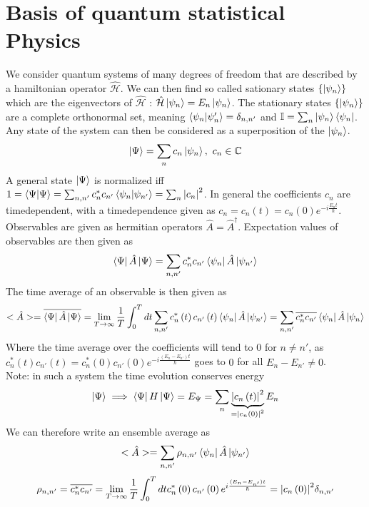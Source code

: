 \documentclass{report}
\begin{document}
\section{Basis of quantum statistical Physics}
We consider quantum systems of many degrees of freedom that are described by a hamiltonian operator $\hat{\mathcal{H}}$. We can then find so called sationary states $\{\ket{\psi_n}\} $ which are the eigenvectors of $\hat{\mathcal{H}}$ : $\hat{\mathcal{H}}\ket{\psi_n} = E_n\ket{\psi_n}$. The stationary states $\{\ket{\psi_n}\} $ are a complete orthonormal set, meaning $\bra{\psi_n}\ket{\psi_n'} = \delta_{n,n'}$ and $\mathbb{I} = \sum_{n} \ket{\psi_n}\bra{\psi_n} $.\\
Any state of the system can then be considered as a superposition of the $\ket{\psi_n}$.\[
  \ket{\Psi} = \sum_{n} c_n \ket{\psi_n} ,  \text{  } c_n \in \mathbb{C} 
\] 
A general state $\ket{\Psi}$ is normalized iff $1 = \bra{\Psi}\ket{\Psi} = \sum_{n,n'} c_n^* c_{n'} \bra{\psi_n}\ket{\psi_{n'}} = \sum_{n} \abs{c_n}^2  $. In general the coefficients $c_n$ are timedependent, with a timedependence given as $c_n = c_n\left( t \right) = c_n\left( 0 \right) e^{-i \frac{E_n t}{\hbar}}$.\\
Observables are given as hermitian operators $\hat{A} = \hat{A}^{\dagger}$. Expectation values of observables are then given as \[
\bra{\Psi} \hat{A} \ket{\Psi} = \sum_{n,n'} c_n^* c_{n'} \bra{\psi_n} \hat{A} \ket{\psi_{n'}} 
\] 
The time average of an observable is then given as \[
  <\hat{A}> = \overline{\bra{\Psi} \hat{A} \ket{\Psi}} = \lim_{T \to \infty} \frac{1}{T} \int_0^T dt \sum_{n,n'}  c_n^*\left( t \right) c_{n'}\left( t \right) \bra{\psi_n} \hat{A} \ket{\psi_{n'}} = \sum_{n,n'} \overline{c_n^* c_{n'}} \bra{\psi_n} \hat{A} \ket{\psi_{n}} 
\] 
Where the time average over the coefficients will tend to $0$ for $n \neq n'$, as $c_n^*\left( t \right) c_{n'}\left( t \right) = c_n^*\left( 0 \right) c_{n'}\left( 0 \right) e^{-i \frac{\left( E_n - E_{n'} \right) t}{\hbar}}$ goes to $0$ for all $E_n - E_{n'} \neq 0$.\\
Note: in such a system the time evolution conserves energy \[
  \ket{\Psi} \implies \bra{\Psi}H \ket{\Psi} = E_{\Psi} = \sum_{n} \underbrace{\abs{c_n\left( t \right) }^2}_{= \abs{c_n\left( 0 \right) }^2} E_n 
\] 
We can therefore write an ensemble average as \[
<\hat{A}> = \sum_{n,n'} \rho_{n,n'} \bra{\psi_n} \hat{A} \ket{\psi_{n'}} 
\] \[
\rho_{n,n'} = \overline{c_n^* c_{n'}}  = \lim_{T \to  \infty} \frac{1}{T} \int_0^T dt c_n^*\left( 0 \right) c_{n'}\left( 0 \right) e^{i \frac{(E_n - E_{n'}) t}{\hbar}} = \abs{c_n\left( 0 \right) }^2 \delta_{n,n'}
\] 
\end{document}
